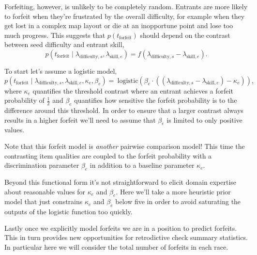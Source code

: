 \documentclass[
  letterpaper,
  DIV=11,
  numbers=noendperiod]{scrartcl}
\begin{document}
Forfeiting, however, is unlikely to be completely random. Entrants are
more likely to forfeit when they're frustrated by the overall
difficulty, for example when they get lost in a complex map layout or
die at an inopportune point and lose too much progress. This suggests
that \(p(t_{\mathrm{forfeit}})\) should depend on the contrast between
seed difficulty and entrant skill, \[
p(t_{\mathrm{forfeit}} \mid \lambda_{\mathrm{difficulty}, s},
                            \lambda_{\mathrm{skill}, e})
=
f(\lambda_{\mathrm{difficulty}, s} - \lambda_{\mathrm{skill}, e}).
\]

To start let's assume a logistic model, \[
p(t_{\mathrm{forfeit}} \mid \lambda_{\mathrm{difficulty}, s},
                            \lambda_{\mathrm{skill}, e},
                            \kappa_{e}, \beta_{e})
= \
\mathrm{logistic}( \beta_{e} \cdot (
                   (   \lambda_{\mathrm{difficulty}, s}
                     - \lambda_{\mathrm{skill}, e})
                    - \kappa_{e}     ) ),
\] where \(\kappa_{e}\) quantifies the threshold contrast where an
entrant achieves a forfeit probability of \(\frac{1}{2}\) and
\(\beta_{e}\) quantifies how sensitive the forfeit probability is to the
difference around this threshold. In order to ensure that a larger
contrast always results in a higher forfeit we'll need to assume that
\(\beta_{e}\) is limited to only positive values.

Note that this forfeit model is \emph{another} pairwise comparison
model! This time the contrasting item qualities are coupled to the
forfeit probability with a discrimination parameter \(\beta_{e}\) in
addition to a baseline parameter \(\kappa_{e}\).

Beyond this functional form it's not straightforward to elicit domain
expertise about reasonable values for \(\kappa_{e}\) and \(\beta_{e}\).
Here we'll take a more heuristic prior model that just constrains
\(\kappa_{e}\) and \(\beta_{e}\) below five in order to avoid saturating
the outputs of the logistic function too quickly.

Lastly once we explicitly model forfeits we are in a position to predict
forfeits. This in turn provides new opportunities for retrodictive check
summary statistics. In particular here we will consider the total number
of forfeits in each race.
\end{document}
